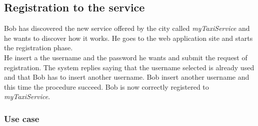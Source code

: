 \subsection{Registration to the service}
Bob has discovered the new service offered by the city called \textit{myTaxiService} and he wants to discover how it works. He goes to the web application site and starts the registration phase.\\
He insert a the username and the password he wants and submit the request of registration. The system replies saying that the username selected is already used and that Bob has to insert another username. Bob insert another username and this time the procedure succeed. Bob is now correctly registered to \textit{myTaxiService}.
\subsubsection{Use case}
